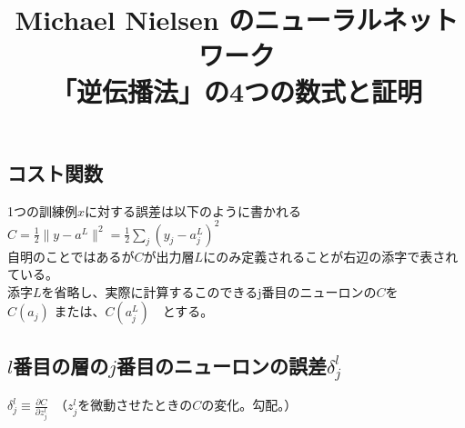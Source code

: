 \documentclass[11pt,a4j,fleqn]{jarticle}
\begin{document}
\title{
	\textbf{\Large  Michael Nielsen のニューラルネットワーク\\
	\bigskip
	「逆伝播法」の4つの数式と証明}\\
	\bigskip
}
\maketitle
\begin{spacing}{1.5}
\section{コスト関数}
1つの訓練例$x$に対する誤差は以下のように書かれる\\
\Large$C = \frac{1}{2} \|y-a^L\|^2 = \frac{1}{2} \sum_j (y_j-a^L_j)^2$\\
\normalsize 自明のことではあるが$C$が出力層$L$にのみ定義されることが右辺の添字で表されている。\\
添字$L$を省略し、実際に計算するこのできるj番目のニューロンの$C$を\\
\Large$C(a_j)$ \normalsize または、$C(a^L_j)$　\normalsize とする。
\subsection{$l$番目の層の$j$番目のニューロンの誤差$\delta^l_j$}
\Large{$\delta^l_j \equiv \frac{\partial C}{\partial z^l_j}$}\normalsize　\hspace{5mm}（$z^l_j$を微動させたときの$C$の変化。勾配。）
\newpage


\end{spacing}
\end{document}
